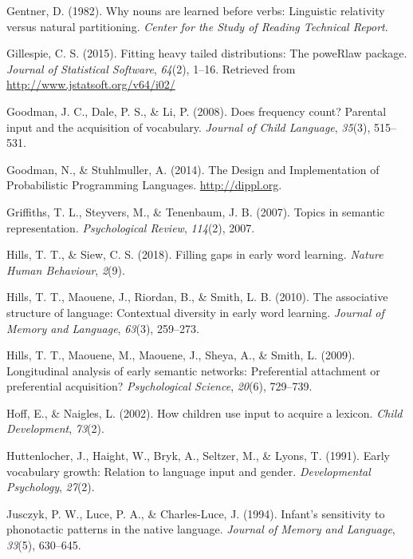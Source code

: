 \documentclass[english,floatsintext,man]{apa6}
\theoremstyle{definition}
\theoremstyle{definition}
\theoremstyle{definition}
\theoremstyle{remark}
\begin{document}
\hypertarget{ref-gentner1982}{}
Gentner, D. (1982). Why nouns are learned before verbs: Linguistic
relativity versus natural partitioning. \emph{Center for the Study of
Reading Technical Report}.

\hypertarget{ref-gillespie15}{}
Gillespie, C. S. (2015). Fitting heavy tailed distributions: The
poweRlaw package. \emph{Journal of Statistical Software}, \emph{64}(2),
1--16. Retrieved from \url{http://www.jstatsoft.org/v64/i02/}

\hypertarget{ref-goodman2008}{}
Goodman, J. C., Dale, P. S., \& Li, P. (2008). Does frequency count?
Parental input and the acquisition of vocabulary. \emph{Journal of Child
Language}, \emph{35}(3), 515--531.

\hypertarget{ref-dippl}{}
Goodman, N., \& Stuhlmuller, A. (2014). The Design and Implementation of
Probabilistic Programming Languages. \url{http://dippl.org}.

\hypertarget{ref-griffiths07}{}
Griffiths, T. L., Steyvers, M., \& Tenenbaum, J. B. (2007). Topics in
semantic representation. \emph{Psychological Review}, \emph{114}(2),
2007.

\hypertarget{ref-hills2018}{}
Hills, T. T., \& Siew, C. S. (2018). Filling gaps in early word
learning. \emph{Nature Human Behaviour}, \emph{2}(9).

\hypertarget{ref-hills2010}{}
Hills, T. T., Maouene, J., Riordan, B., \& Smith, L. B. (2010). The
associative structure of language: Contextual diversity in early word
learning. \emph{Journal of Memory and Language}, \emph{63}(3), 259--273.

\hypertarget{ref-hills2009}{}
Hills, T. T., Maouene, M., Maouene, J., Sheya, A., \& Smith, L. (2009).
Longitudinal analysis of early semantic networks: Preferential
attachment or preferential acquisition? \emph{Psychological Science},
\emph{20}(6), 729--739.

\hypertarget{ref-hoff2002}{}
Hoff, E., \& Naigles, L. (2002). How children use input to acquire a
lexicon. \emph{Child Development}, \emph{73}(2).

\hypertarget{ref-huttenlocher1991}{}
Huttenlocher, J., Haight, W., Bryk, A., Seltzer, M., \& Lyons, T.
(1991). Early vocabulary growth: Relation to language input and gender.
\emph{Developmental Psychology}, \emph{27}(2).

\hypertarget{ref-jusczyk1994}{}
Jusczyk, P. W., Luce, P. A., \& Charles-Luce, J. (1994). Infant's
sensitivity to phonotactic patterns in the native language.
\emph{Journal of Memory and Language}, \emph{33}(5), 630--645.
\end{document}
